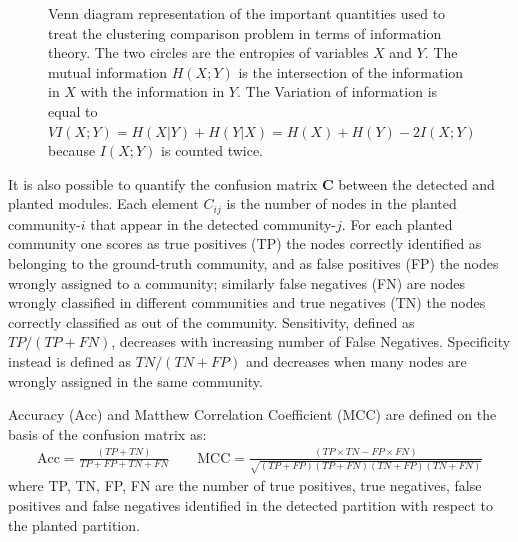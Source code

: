\documentclass[11pt,              a4paper,              twoside,openright,              titlepage,              headinclude,footinclude,                            numbers=noenddot,              cleardoublepage=empty,]{scrreprt}
\begin{document}
\begin{figure}[htb!]
\centering
{}
\caption{Venn diagram representation of the important quantities used to treat the clustering comparison problem in terms of information theory.
The two circles are the entropies of variables $X$ and $Y$.
The mutual information $H(X;Y)$ is the intersection of the information in $X$ with the information in $Y$.
The Variation of information is equal to $VI(X;Y)=H(X|Y)+H(Y|X)=H(X)+H(Y)-2I(X;Y)$ because $I(X;Y)$ is counted twice.}
\label{fig:venn_diagram}
\end{figure}


It is also possible to quantify the confusion matrix $\mathbf{C}$ between the detected and planted modules.
Each element $C_{ij}$ is the number of nodes in the planted community-$i$ that appear in the detected community-$j$.
For each planted community one scores as true positives (TP) the nodes correctly identified as belonging to the ground-truth community, and as false positives (FP) the nodes wrongly assigned to a community; similarly false negatives (FN) are nodes wrongly classified in different communities and true negatives (TN) the nodes correctly classified as out of the community. Sensitivity, defined as $TP/(TP+FN)$, decreases with increasing number of False Negatives. Specificity instead is defined as $TN/(TN+FP)$ and decreases when many nodes are wrongly assigned in the same community. 

Accuracy (Acc) and Matthew Correlation Coefficient (MCC) are defined on the basis of the confusion matrix as:
\begin{align*}
\textrm{Acc}=\frac{(TP+TN)}{TP+FP+TN+FN} \qquad \textrm{MCC}=\frac{(TP\times TN-FP\times FN)}{\sqrt{(TP+FP)(TP+FN)(TN+FP)(TN+FN)}}
\end{align*}
where TP, TN, FP, FN are the number of true positives, true negatives, false positives and false negatives identified in the detected partition with respect to the planted partition.
\end{document}
